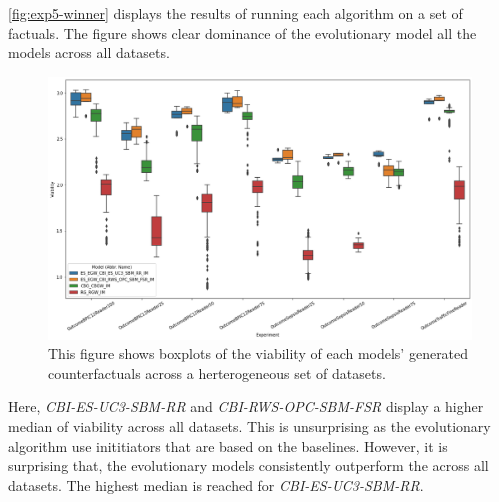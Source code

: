 \documentclass[./../../paper.tex]{subfiles}
\begin{document}
\autoref{fig:exp5-winner} displays the results of running each algorithm on a set of factuals. The figure shows clear dominance of the evolutionary model all the models across all datasets. 

\begin{figure}[htbp]
    \centering
    \includegraphics[width=\textwidth]{figures/generated/exp5_winner_overall.png}
    \caption{This figure shows boxplots of the viability of each models' generated counterfactuals across a herterogeneous set of datasets.}
    \label{fig:exp5-winner}
\end{figure}

Here, \emph{CBI-ES-UC3-SBM-RR} and \emph{CBI-RWS-OPC-SBM-FSR} display a higher median of viability across all datasets. This is unsurprising as the evolutionary algorithm use inititiators that are based on the baselines. However, it is surprising that, the evolutionary models consistently outperform the \ModelCBG across all datasets. The highest median is reached for \emph{CBI-ES-UC3-SBM-RR}.

\end{document}

